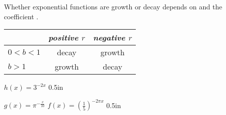 Whether exponential functions are growth or decay depends on  
 and the coefficient .

\begin{tcolorbox}[colback=white,center,width=3.75in]
\begin{center}
    \large
    \renewcommand{\arraystretch}{1.25}
    \begin{tabular}{l||c|c}
        & {\itshape positive $r$} & {\itshape negative $r$} \\ \hline\hline
        $0<b<1$ & decay & growth \\ \hline
        $b>1$   & growth & decay \\ 
    \end{tabular}
\end{center}
\end{tcolorbox}
        


{
    $h(x) = 3^{-2x}$    
}
{0.5in}

\myProblems
{
    $g(x) = \pi^{-\frac{x}{10}}$    
}
{
    $f(x) = \left(\frac{1}{5}\right)^{-2\pi x}$   
}
{0.5in}
